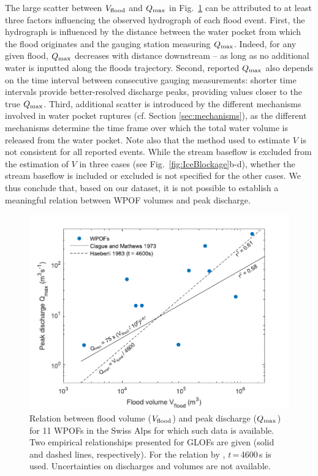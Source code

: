 The large scatter between $V_{\rm{flood}}$ and $Q_{\rm{max}}$ in Fig.~\ref{fig:vflood_qmax} can be attributed to at least three factors influencing the observed hydrograph of each flood event. First, the hydrograph is influenced by the distance between the water pocket from which the flood originates and the gauging station measuring $Q_{\rm{max}}$. Indeed, for any given flood, $Q_{\rm{max}}$ decreases with distance downstream -- as long as no additional water is inputted along the floods trajectory. Second, reported $Q_{\rm{max}}$ also depends on the time interval between consecutive gauging measurements: shorter time intervals provide better-resolved discharge peaks, providing values closer to the true $Q_{\rm{max}}$. Third, additional scatter is introduced by the different mechanisms involved in water pocket ruptures (cf. Section \ref{sec:mechanisms}), as the different mechanisms determine the time frame over which the total water volume is released from the water pocket. Note also that the method used to estimate $V$ is not consistent for all reported events. While the stream baseflow is excluded from the estimation of $V$ in three cases (see Fig.~\ref{fig:IceBlockage}b-d), whether the stream baseflow is included or excluded is not specified for the other cases. We thus conclude that, based on our dataset, it is not possible to establish a meaningful relation between WPOF volumes and peak discharge. 


\begin{figure}[H]
    \centering
    \includegraphics[width=0.8\linewidth]{chapters/Discussion/Qmax_Vflood_scaling_fig.pdf}
    \caption{Relation between flood volume ($V_{\rm{flood}}$) and peak discharge ($Q_{\rm{max}}$) for 11 WPOFs in the Swiss Alps for which such data is available. Two empirical relationships presented for GLOFs \citep{Clague&Mathews1973, Haeberli1983} are given (solid and dashed lines, respectively). For the relation by \cite{Haeberli1983}, $t$\,=\,4600\,s is used. Uncertainties on discharges and volumes are not available.}
    \label{fig:vflood_qmax}
\end{figure}


